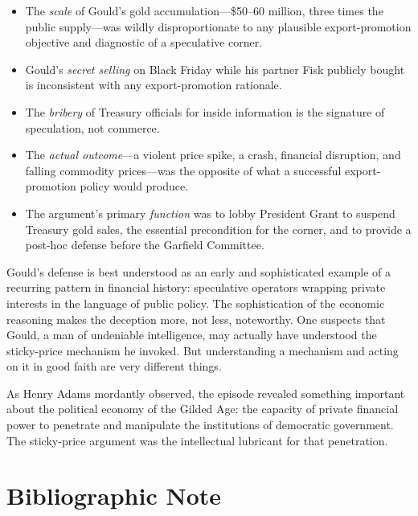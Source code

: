 \documentclass[12pt]{article}
\begin{document}
\begin{itemize}
    \item The \emph{scale} of Gould's gold accumulation---\$50--60 
    million, three times the public supply---was wildly disproportionate 
    to any plausible export-promotion objective and diagnostic of a 
    speculative corner.
    
    \item Gould's \emph{secret selling} on Black Friday while his 
    partner Fisk publicly bought is inconsistent with any 
    export-promotion rationale.
    
    \item The \emph{bribery} of Treasury officials for inside 
    information is the signature of speculation, not commerce.
    
    \item The \emph{actual outcome}---a violent price spike, a crash, 
    financial disruption, and falling commodity prices---was the 
    opposite of what a successful export-promotion policy would 
    produce.
    
    \item The argument's primary \emph{function} was to lobby President 
    Grant to suspend Treasury gold sales, the essential precondition 
    for the corner, and to provide a post-hoc defense before the 
    Garfield Committee.
\end{itemize}

Gould's defense is best understood as an early and sophisticated example 
of a recurring pattern in financial history: speculative operators 
wrapping private interests in the language of public policy. The 
sophistication of the economic reasoning makes the deception more, not 
less, noteworthy. One suspects that Gould, a man of undeniable 
intelligence, may actually have understood the sticky-price mechanism he 
invoked. But understanding a mechanism and acting on it in good faith 
are very different things.

As Henry Adams mordantly observed, the episode revealed something 
important about the political economy of the Gilded Age: the capacity 
of private financial power to penetrate and manipulate the institutions 
of democratic government. The sticky-price argument was the intellectual 
lubricant for that penetration.

\section*{Bibliographic Note}
\end{document}
